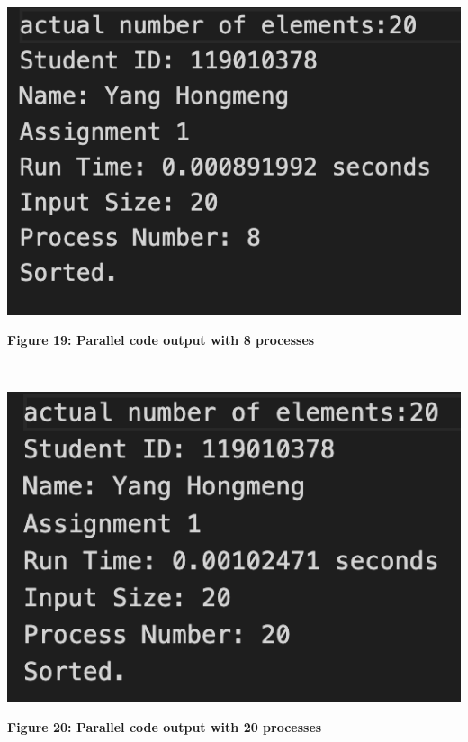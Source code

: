 ~\\
\centerline {\includegraphics[scale = 1, width=14cm]{para_8}}
\centerline{\textbf {Figure 19: Parallel code output with 8 processes}}

~\\
\centerline {\includegraphics[scale = 1, width=14cm]{para_20}}
\centerline{\textbf {Figure 20: Parallel code output with 20 processes}}


